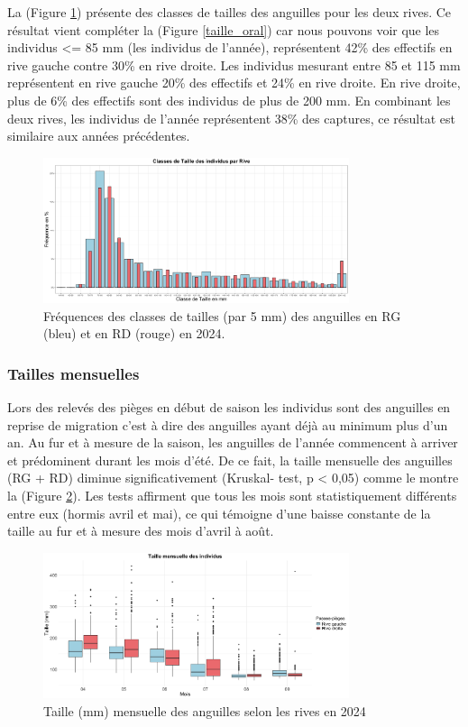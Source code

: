 \documentclass[11pt,titlepage,twoside]{article}\usepackage[]{graphicx}\usepackage[table]{xcolor}
\begin{document}
La (Figure \ref{classe_taille_oral}) présente des classes de tailles des anguilles pour les deux rives. Ce résultat vient compléter la (Figure \ref{taille_oral}) car nous pouvons voir que les individus <= 85 mm (les individus de l’année), représentent 42\% des effectifs en rive gauche contre 30\% en rive droite. Les individus mesurant entre 85 et 115 mm représentent en rive gauche 20\% des effectifs et 24\% en rive droite. En rive droite, plus de 6\% des effectifs sont des individus de plus de 200 mm. En combinant les deux rives, les individus de l’année représentent 38\% des captures, ce résultat est similaire aux années précédentes. 


\begin{figure}[htpb]
\centering
\includegraphics[width=0.8\textwidth]{classe_taille_oral.png}
\caption{Fréquences des classes de tailles (par 5 mm) des anguilles en RG (bleu) et en RD (rouge) en 2024.}
\label{classe_taille_oral}
\end{figure}

\subsubsection{Tailles mensuelles}

Lors des relevés des pièges en début de saison les individus sont des anguilles en reprise de migration c’est à dire des anguilles ayant déjà au minimum plus d’un an. Au fur et à mesure de la saison, les anguilles de l’année commencent à arriver et prédominent durant les mois d’été. De ce fait, la taille mensuelle des anguilles (RG + RD) diminue significativement (Kruskal- test, p < 0,05) comme le montre la (Figure \ref{taille_mois_oral}). Les tests affirment que tous les mois sont statistiquement différents entre eux (hormis avril et mai), ce qui témoigne d’une baisse constante de la taille au fur et à mesure des mois d’avril à août.


\begin{figure}[htpb]
\centering
\includegraphics[width=0.8\textwidth]{taille_mois_oral.png}
\caption{Taille (mm) mensuelle des anguilles selon les rives en 2024}
\label{taille_mois_oral}
\end{figure} 
\end{document}
